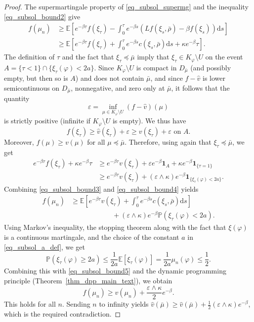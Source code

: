 \documentclass{article}
\theoremstyle{definition}
\numberwithin{equation}{section}
\numberwithin{theorem}{section}
\newcommand{\E}{\mathbb{E}}
\renewcommand{\P}{\mathbb{P}}
\newcommand{\ds}{\mathrm{d}s}
\renewcommand{\P}{{\mathbb P}}
\begin{document}
\begin{proof}
The supermartingale property of \eqref{eq_subsol_supermg} and the inequality \eqref{eq_subsol_bound2} give
\begin{equation}\label{eq_subsol_bound3}
\begin{aligned}
f(\mu_n) &\ge \E\left[ e^{-\beta \tau} f(\xi_{\tau}) - \int_0^{\tau} e^{-\beta s} ( Lf(\xi_s,\bar\rho) - \beta f(\xi_s)) \ds \right] \\
&\ge \E\left[ e^{-\beta \tau} f(\xi_\tau) + \int_0^\tau e^{-\beta s} c(\xi_s,\bar\rho) \ds + \kappa e^{-\beta}  \tau \right].
\end{aligned}
\end{equation}
The definition of $\tau$ and the fact that $\xi_\tau\preceq\bar\mu$ imply that $\xi_\tau\in K_\varphi\setminus U$ on the event $A=\{\tau<1\}\cap\{\xi_\tau(\varphi) < 2 a\}$. Since $K_\varphi\setminus U$ is compact in $D_{\bar\mu}$ (and possibly empty, but then so is $A$) and does not contain $\bar\mu$, and since $f-\hat v$ is lower semicontinuous on $D_{\bar\mu}$, nonnegative, and zero only at $\bar\mu$, it follows that the quantity
\[
\varepsilon=\inf_{\mu\in K_\varphi\setminus U}(f-\hat v)(\mu)
\]
is strictly positive (infinite if $K_\varphi\setminus U$ is empty). We thus have
\[
\text{$f(\xi_\tau)\ge \hat v(\xi_\tau)+\varepsilon \ge v(\xi_\tau)+\varepsilon$ on $A$.}
\]
Moreover, $f(\mu)\ge v(\mu)$ for all $\mu\preceq\bar\mu$. Therefore, using again that $\xi_\tau\preceq\bar\mu$, we get
\begin{equation}\label{eq_subsol_bound4}
\begin{aligned}
e^{-\beta \tau}f(\xi_\tau) + \kappa e^{-\beta} \tau &\ge e^{-\beta \tau}v(\xi_\tau) + \varepsilon e^{-\beta} \bm 1_A + \kappa e^{-\beta} \bm1_{\{\tau=1\}} \\
&\ge  e^{-\beta \tau}v(\xi_\tau) + (\varepsilon\wedge\kappa) e^{-\beta} \bm1_{\{\xi_\tau(\varphi) < 2 a\}}.
\end{aligned}
\end{equation}
Combining \eqref{eq_subsol_bound3} and \eqref{eq_subsol_bound4} yields
\begin{equation}\label{eq_subsol_bound5}
\begin{aligned}
f(\mu_n) &\ge \E\left[ e^{-\beta \tau} v(\xi_\tau) + \int_0^\tau e^{-\beta s} c(\xi_s,\bar\rho) \ds \right] \\
&\qquad\qquad\qquad + (\varepsilon \wedge \kappa)e^{-\beta} \P(\xi_\tau(\varphi) < 2 a).
\end{aligned}
\end{equation}
Using Markov's inequality, the stopping theorem along with the fact that $\xi(\varphi)$ is a continuous martingale, and the choice of the constant $a$ in \eqref{eq_subsol_a_def}, we get
\[
\P(\xi_\tau(\varphi) \ge 2a) \le \frac{1}{2a} \E[\xi_\tau(\varphi)] = \frac{1}{2a} \mu_n(\varphi) \le \frac12.
\]
Combining this with \eqref{eq_subsol_bound5} and the dynamic programming principle (Theorem~\ref{thm_dpp_main_text}), we obtain
\[
f(\mu_n) \ge v(\mu_n) + \frac{\varepsilon \wedge \kappa}{2}e^{-\beta}.
\]
This holds for all $n$. Sending $n$ to infinity yields $\hat v(\bar\mu)\ge \hat v(\bar\mu) + \frac12(\varepsilon \wedge \kappa)e^{-\beta}$, which is the required contradiction.
\end{proof}
\end{document}
